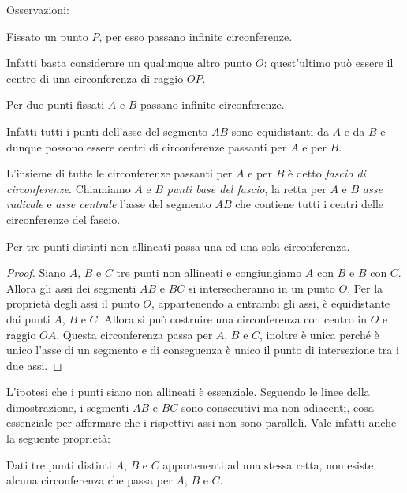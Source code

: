 Osservazioni:
\begin{itemize*}
\item Fissato un punto $P$, per esso passano infinite circonferenze.

Infatti basta considerare un qualunque altro punto $O$: quest'ultimo può essere il centro di una circonferenza di raggio $OP$.

\item Per due punti fissati $A$ e $B$ passano infinite circonferenze.

Infatti tutti i punti dell'asse del segmento $AB$ sono equidistanti da $A$ e da $B$ e dunque possono essere centri di circonferenze passanti per $A$ e per $B$.
\end{itemize*}

\begin{definizione}
L'insieme di tutte le circonferenze passanti per $A$ e per $B$ è detto \emph{fascio di circonferenze}. Chiamiamo $A$ e $B$ \emph{punti base del fascio}, la retta per $A$ e $B$ \emph{asse radicale} e \emph{asse centrale} l'asse del segmento $AB$ che contiene tutti i centri delle circonferenze del fascio.
\end{definizione}

\begin{teorema}
Per tre punti distinti non allineati passa una ed una sola circonferenza.
\end{teorema}

\begin{proof}
Siano $A$, $B$ e $C$ tre punti non allineati e congiungiamo $A$ con $B$ e $B$ con $C$. Allora gli assi dei segmenti $AB$ e $BC$ si intersecheranno in un punto $O$. Per la proprietà degli assi il punto $O$, appartenendo a entrambi gli assi, è equidistante dai punti $A$, $B$ e $C$. Allora si può costruire una circonferenza con centro in $O$ e raggio $OA$. Questa circonferenza passa per $A$, $B$ e $C$, inoltre è unica perché è unico l'asse di un segmento e di conseguenza è unico il punto di intersezione tra i due assi.
\end{proof}

\osservazione
L'ipotesi che i punti siano non allineati è essenziale. Seguendo le linee della dimostrazione, i segmenti $AB$ e $BC$ sono consecutivi ma non adiacenti, cosa essenziale per affermare che i rispettivi assi non sono paralleli. Vale infatti anche la seguente proprietà:
\begin{teorema}
Dati tre punti distinti $A$, $B$ e $C$ appartenenti ad una stessa retta, non esiste alcuna circonferenza che passa per $A$, $B$ e $C$.
\end{teorema}

